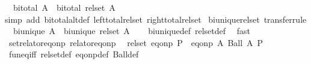 \begin{isabellebody}
\ \ {\isachardoublequoteopen}bi{\isacharunderscore}{\kern0pt}total\ A\ {\isasymLongrightarrow}\ bi{\isacharunderscore}{\kern0pt}total\ {\isacharparenleft}{\kern0pt}rel{\isacharunderscore}{\kern0pt}set\ A{\isacharparenright}{\kern0pt}{\isachardoublequoteclose}\isanewline
%
\isadelimproof
\ \ %
\endisadelimproof
%
\isatagproof
{}\isamarkupfalse%
{\isacharparenleft}{\kern0pt}simp\ add{\isacharcolon}{\kern0pt}\ bi{\isacharunderscore}{\kern0pt}total{\isacharunderscore}{\kern0pt}alt{\isacharunderscore}{\kern0pt}def\ left{\isacharunderscore}{\kern0pt}total{\isacharunderscore}{\kern0pt}rel{\isacharunderscore}{\kern0pt}set\ right{\isacharunderscore}{\kern0pt}total{\isacharunderscore}{\kern0pt}rel{\isacharunderscore}{\kern0pt}set{\isacharparenright}{\kern0pt}%
\endisatagproof
{\isafoldproof}%
%
\isadelimproof
\isanewline
%
\endisadelimproof
\isanewline
{}\isamarkupfalse%
\ bi{\isacharunderscore}{\kern0pt}unique{\isacharunderscore}{\kern0pt}rel{\isacharunderscore}{\kern0pt}set\ {\isacharbrackleft}{\kern0pt}transfer{\isacharunderscore}{\kern0pt}rule{\isacharbrackright}{\kern0pt}{\isacharcolon}{\kern0pt}\isanewline
\ \ {\isachardoublequoteopen}bi{\isacharunderscore}{\kern0pt}unique\ A\ {\isasymLongrightarrow}\ bi{\isacharunderscore}{\kern0pt}unique\ {\isacharparenleft}{\kern0pt}rel{\isacharunderscore}{\kern0pt}set\ A{\isacharparenright}{\kern0pt}{\isachardoublequoteclose}\isanewline
%
\isadelimproof
\ \ %
\endisadelimproof
%
\isatagproof
{}\isamarkupfalse%
\ bi{\isacharunderscore}{\kern0pt}unique{\isacharunderscore}{\kern0pt}def\ rel{\isacharunderscore}{\kern0pt}set{\isacharunderscore}{\kern0pt}def\ \isamarkupfalse%
\ fast%
\endisatagproof
{\isafoldproof}%
%
\isadelimproof
\isanewline
%
\endisadelimproof
\isanewline
{}\isamarkupfalse%
\ set{\isacharunderscore}{\kern0pt}relator{\isacharunderscore}{\kern0pt}eq{\isacharunderscore}{\kern0pt}onp\ {\isacharbrackleft}{\kern0pt}relator{\isacharunderscore}{\kern0pt}eq{\isacharunderscore}{\kern0pt}onp{\isacharbrackright}{\kern0pt}{\isacharcolon}{\kern0pt}\isanewline
\ \ {\isachardoublequoteopen}rel{\isacharunderscore}{\kern0pt}set\ {\isacharparenleft}{\kern0pt}eq{\isacharunderscore}{\kern0pt}onp\ P{\isacharparenright}{\kern0pt}\ {\isacharequal}{\kern0pt}\ eq{\isacharunderscore}{\kern0pt}onp\ {\isacharparenleft}{\kern0pt}{\isasymlambda}A{\isachardot}{\kern0pt}\ Ball\ A\ P{\isacharparenright}{\kern0pt}{\isachardoublequoteclose}\isanewline
%
\isadelimproof
\ \ %
\endisadelimproof
%
\isatagproof
{}\isamarkupfalse%
\ fun{\isacharunderscore}{\kern0pt}eq{\isacharunderscore}{\kern0pt}iff\ rel{\isacharunderscore}{\kern0pt}set{\isacharunderscore}{\kern0pt}def\ eq{\isacharunderscore}{\kern0pt}onp{\isacharunderscore}{\kern0pt}def\ Ball{\isacharunderscore}{\kern0pt}def\ \isamarkupfalse%

\end{isabellebody}
